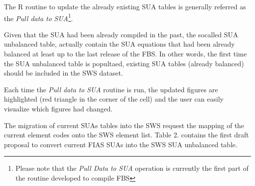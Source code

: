 \documentclass[nojss]{jss}
\begin{document}
The R routine to update the already existing SUA tables is generally referred as the \textit{Pull data to SUA}\footnote{Please note that the \textit{Pull Data to SUA} operation is currently the first part of the routine developed to compile FBS}.

Given that the SUA had been already compiled in the past, the socalled SUA unbalanced table, actually contain the SUA equations that had been already balanced at least up to the last release of the FBS. In other words, the first time the SUA unbalanced table is popultaed, existing SUA tables (already balanced) should be included in the SWS dataset. 

Each time the \textit{Pull data to SUA} routine is run, the updated figures are highlighted (red triangle in the corner of the cell) and the user can easily visualize which figures had changed.


The migration of current SUAs tables into the SWS request the mapping of the current element codes onto the SWS element list. Table 2. contains the first draft proposal to convert current FIAS SUAs into the SWS SUA unbalanced table.
\end{document}
